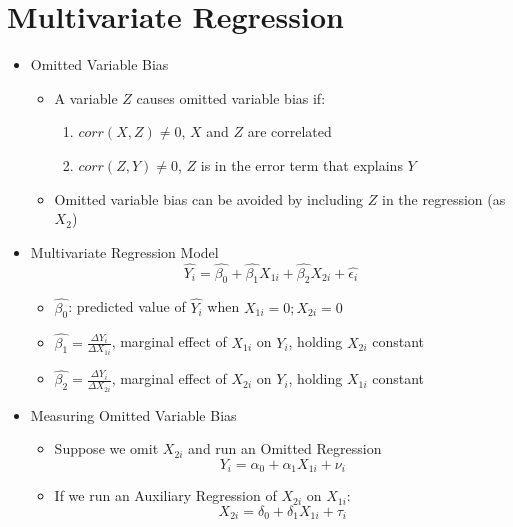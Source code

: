 \documentclass{article}
\begin{document}
\clearpage 

\section*{Multivariate Regression}

\begin{itemize}
	\item Omitted Variable Bias 
	\begin{itemize}
		\item A variable $Z$ causes omitted variable bias if: 
		\begin{enumerate}
			\item $corr(X,Z) \neq 0$, $X$ and $Z$ are correlated
			\item $corr(Z, Y) \neq 0$, $Z$ is in the error term that explains $Y$	
		\end{enumerate}
		\item Omitted variable bias can be avoided by including $Z$ in the regression (as $X_2$) 
	\end{itemize}	
	\item Multivariate Regression Model
	\begin{equation*}
	\widehat{Y_i}=\hat{\beta_0}+\hat{\beta_1}X_{1i}+\hat{\beta_2}X_{2i}+\hat{\epsilon_i}	
	\end{equation*}
	\begin{itemize}
		\item $\hat{\beta_0}$: predicted value of $\hat{Y_i}$ when $X_{1i}=0; X_{2i}=0$
		\item $\hat{\beta_1}=\displaystyle\frac{\Delta Y_i}{\Delta X_{1i}}$, marginal effect of $X_{1i}$ on $Y_i$, holding $X_{2i}$ constant
		\item $\hat{\beta_2}=\displaystyle\frac{\Delta Y_i}{\Delta X_{2i}}$, marginal effect of $X_{2i}$ on $Y_i$, holding $X_{1i}$ constant
	\end{itemize} 
	\item Measuring Omitted Variable Bias
	\begin{itemize}
		\item Suppose we omit $X_{2i}$ and run an Omitted Regression
		\begin{equation*}
	Y_i=\alpha_0+\alpha_1X_{1i}+\nu_{i}	
		\end{equation*}
		\item If we run an Auxiliary Regression of $X_{2i}$ on $X_{1i}$:
		\begin{equation*}
			X_{2i}=\delta_0+\delta_1 X_{1i}+\tau_i	
		\end{equation*}

\end{itemize}
\end{itemize}
\end{document}
